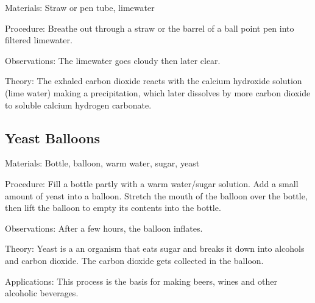 \begin{multicols}{2}
\begin{description*}
\item[Materials:]{Straw or pen tube, limewater}
\item[Procedure:]{Breathe out through a straw or the barrel of a ball point pen into filtered limewater.}
\item[Observations:]{The limewater goes cloudy then later clear.}
\item[Theory:]{The exhaled carbon dioxide reacts with the calcium hydroxide solution (lime water) making a precipitation, which later dissolves by more carbon dioxide to soluble calcium hydrogen
carbonate.}
\end{description*}

\subsection{Yeast Balloons} %


\begin{description*}
\item[Materials:]{Bottle, balloon, warm water, sugar, yeast}
\item[Procedure:]{Fill a bottle partly with a warm water/sugar solution. Add a small amount of yeast into a balloon. Stretch the mouth of the balloon over the bottle, then lift the balloon to empty its contents into the bottle.}
\item[Observations:]{After a few hours, the balloon inflates.}
\item[Theory:]{Yeast is a an organism that eats sugar and breaks it down into alcohols and carbon dioxide. The carbon dioxide gets collected in the balloon.}
\item[Applications:]{This process is the basis for making beers, wines and other alcoholic beverages.}
\end{description*}


\end{multicols}
